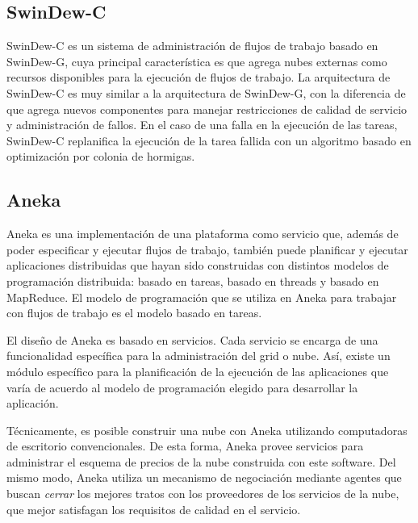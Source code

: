 \subsection{SwinDew-C}

SwinDew-C \cite{liu2010swindew} es un sistema de administración de flujos de trabajo basado en SwinDew-G, cuya principal característica es que agrega nubes externas como recursos disponibles para la ejecución de flujos de trabajo. La arquitectura de SwinDew-C es muy similar a la arquitectura de SwinDew-G, con la diferencia de que agrega nuevos componentes para manejar restricciones de calidad de servicio y administración de fallos. En el caso de una falla en la ejecución de las tareas, SwinDew-C replanifica la ejecución de la tarea fallida con un algoritmo basado en optimización por colonia de hormigas.

\subsection{Aneka}

Aneka \cite{chu2007aneka} es una implementación de una plataforma como servicio que, además de poder especificar y ejecutar flujos de trabajo, también puede planificar y ejecutar aplicaciones distribuidas que hayan sido construidas con distintos modelos de programación distribuida: basado en tareas, basado en threads y basado en MapReduce. El modelo de programación que se utiliza en Aneka para trabajar con flujos de trabajo es el modelo basado en tareas.

El diseño de Aneka es basado en servicios. Cada servicio se encarga de una funcionalidad específica para la administración del grid o nube. Así, existe un módulo específico para la planificación de la ejecución de las aplicaciones que varía de acuerdo al modelo de programación elegido para desarrollar la aplicación.

Técnicamente, es posible construir una nube con Aneka \cite{vecchiola2009aneka} utilizando computadoras de escritorio convencionales. De esta forma, Aneka provee servicios para administrar el esquema de precios de la nube construida con este software. Del mismo modo, Aneka utiliza un mecanismo de negociación mediante agentes que buscan \emph{cerrar} los mejores tratos con los proveedores de los servicios de la nube, que mejor satisfagan los requisitos de calidad en el servicio.

